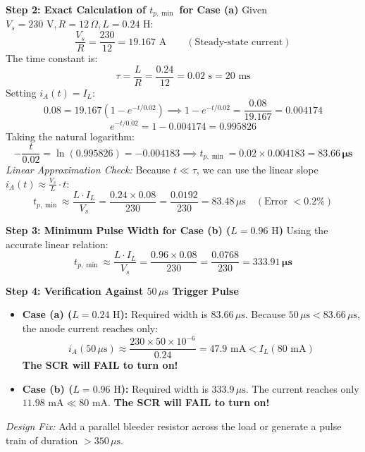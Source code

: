 \documentclass[11pt,a4paper]{article}
\begin{document}
\begin{examplebox}
\textbf{Step 2: Exact Calculation of $t_{p,\min}$ for Case (a)}
Given $V_s = 230\text{ V}, R = 12\,\Omega, L = 0.24\text{ H}$:
\begin{equation}
\frac{V_s}{R} = \frac{230}{12} = 19.167\text{ A} \qquad (\text{Steady-state current})
\end{equation}
The time constant is:
\begin{equation}
\tau = \frac{L}{R} = \frac{0.24}{12} = 0.02\text{ s} = 20\text{ ms}
\end{equation}
Setting $i_A(t) = I_L$:
\begin{equation}
0.08 = 19.167 \left(1 - e^{-t / 0.02}\right) \implies 1 - e^{-t / 0.02} = \frac{0.08}{19.167} = 0.004174
\end{equation}
\begin{equation}
e^{-t / 0.02} = 1 - 0.004174 = 0.995826
\end{equation}
Taking the natural logarithm:
\begin{equation}
-\frac{t}{0.02} = \ln(0.995826) = -0.004183 \implies t_{p,\min} = 0.02 \times 0.004183 = \mathbf{83.66\,\mu\text{s}}
\end{equation}
\textit{Linear Approximation Check:} Because $t \ll \tau$, we can use the linear slope $i_A(t) \approx \frac{V_s}{L} \cdot t$:
\begin{equation}
t_{p,\min} \approx \frac{L \cdot I_L}{V_s} = \frac{0.24 \times 0.08}{230} = \frac{0.0192}{230} = 83.48\,\mu\text{s} \quad (\text{Error } < 0.2\%)
\end{equation}

\textbf{Step 3: Minimum Pulse Width for Case (b) ($L = 0.96\text{ H}$)}
Using the accurate linear relation:
\begin{equation}
t_{p,\min} \approx \frac{L \cdot I_L}{V_s} = \frac{0.96 \times 0.08}{230} = \frac{0.0768}{230} = \mathbf{333.91\,\mu\text{s}}
\end{equation}

\textbf{Step 4: Verification Against $50\,\mu\text{s}$ Trigger Pulse}
\begin{itemize}[leftmargin=*]
  \item \textbf{Case (a) ($L = 0.24\text{ H}$):} Required width is $83.66\,\mu\text{s}$. Because $50\,\mu\text{s} < 83.66\,\mu\text{s}$, the anode current reaches only:
  \begin{equation}
  i_A(50\,\mu\text{s}) \approx \frac{230 \times 50 \times 10^{-6}}{0.24} = 47.9\text{ mA} < I_L (80\text{ mA})
  \end{equation}
  \textbf{The SCR will FAIL to turn on!}
  \item \textbf{Case (b) ($L = 0.96\text{ H}$):} Required width is $333.9\,\mu\text{s}$. The current reaches only $11.98\text{ mA} \ll 80\text{ mA}$. \textbf{The SCR will FAIL to turn on!}
\end{itemize}
\textit{Design Fix:} Add a parallel bleeder resistor across the load or generate a pulse train of duration $> 350\,\mu\text{s}$.
\end{examplebox}
\end{document}
